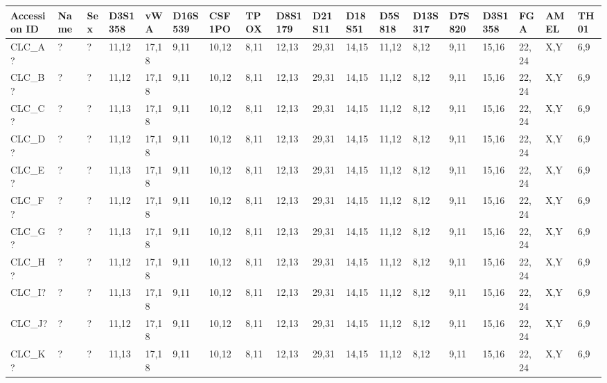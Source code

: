 \documentclass[UTF8,10pt,a4paper,fontset=fandol]{ctexart}
\begin{document}
\begin{center}
\scriptsize
\begin{tabular}{|p{1.55cm}|p{0.75cm}|p{0.45cm}|p{0.55cm}|p{0.55cm}|p{0.55cm}|p{0.55cm}|p{0.55cm}|p{0.55cm}|p{0.55cm}|p{0.55cm}|p{0.55cm}|p{0.55cm}|p{0.55cm}|p{0.55cm}|p{0.55cm}|p{0.55cm}|p{0.55cm}|}
\hline
\textbf{Accession ID} &
\textbf{Name} &
\textbf{Sex} &
\textbf{D3S1358} &
\textbf{vWA} &
\textbf{D16S539} &
\textbf{CSF1PO} &
\textbf{TPOX} &
\textbf{D8S1179} &
\textbf{D21S11} &
\textbf{D18S51} &
\textbf{D5S818} &
\textbf{D13S317} &
\textbf{D7S820} &
\textbf{D3S1358} &
\textbf{FGA} &
\textbf{AMEL} &
\textbf{TH01}
\\
\hline
CLC\_A? &
? &
? &
11,12 &
17,18 &
9,11 &
10,12 &
8,11 &
12,13 &
29,31 &
14,15 &
11,12 &
8,12 &
9,11 &
15,16 &
22,24 &
X,Y &
6,9
\\
\hline
CLC\_B? &
? &
? &
11,12 &
17,18 &
9,11 &
10,12 &
8,11 &
12,13 &
29,31 &
14,15 &
11,12 &
8,12 &
9,11 &
15,16 &
22,24 &
X,Y &
6,9
\\
\hline
CLC\_C? &
? &
? &
11,13 &
17,18 &
9,11 &
10,12 &
8,11 &
12,13 &
29,31 &
14,15 &
11,12 &
8,12 &
9,11 &
15,16 &
22,24 &
X,Y &
6,9
\\
\hline
CLC\_D? &
? &
? &
11,12 &
17,18 &
9,11 &
10,12 &
8,11 &
12,13 &
29,31 &
14,15 &
11,12 &
8,12 &
9,11 &
15,16 &
22,24 &
X,Y &
6,9
\\
\hline
CLC\_E? &
? &
? &
11,13 &
17,18 &
9,11 &
10,12 &
8,11 &
12,13 &
29,31 &
14,15 &
11,12 &
8,12 &
9,11 &
15,16 &
22,24 &
X,Y &
6,9
\\
\hline
CLC\_F? &
? &
? &
11,12 &
17,18 &
9,11 &
10,12 &
8,11 &
12,13 &
29,31 &
14,15 &
11,12 &
8,12 &
9,11 &
15,16 &
22,24 &
X,Y &
6,9
\\
\hline
CLC\_G? &
? &
? &
11,13 &
17,18 &
9,11 &
10,12 &
8,11 &
12,13 &
29,31 &
14,15 &
11,12 &
8,12 &
9,11 &
15,16 &
22,24 &
X,Y &
6,9
\\
\hline
CLC\_H? &
? &
? &
11,12 &
17,18 &
9,11 &
10,12 &
8,11 &
12,13 &
29,31 &
14,15 &
11,12 &
8,12 &
9,11 &
15,16 &
22,24 &
X,Y &
6,9
\\
\hline
CLC\_I? &
? &
? &
11,13 &
17,18 &
9,11 &
10,12 &
8,11 &
12,13 &
29,31 &
14,15 &
11,12 &
8,12 &
9,11 &
15,16 &
22,24 &
X,Y &
6,9
\\
\hline
CLC\_J? &
? &
? &
11,12 &
17,18 &
9,11 &
10,12 &
8,11 &
12,13 &
29,31 &
14,15 &
11,12 &
8,12 &
9,11 &
15,16 &
22,24 &
X,Y &
6,9
\\
\hline
CLC\_K? &
? &
? &
11,13 &
17,18 &
9,11 &
10,12 &
8,11 &
12,13 &
29,31 &
14,15 &
11,12 &
8,12 &
9,11 &
15,16 &
22,24 &
X,Y &
6,9
\\
\hline
\end{tabular}
\end{center}
\end{document}
